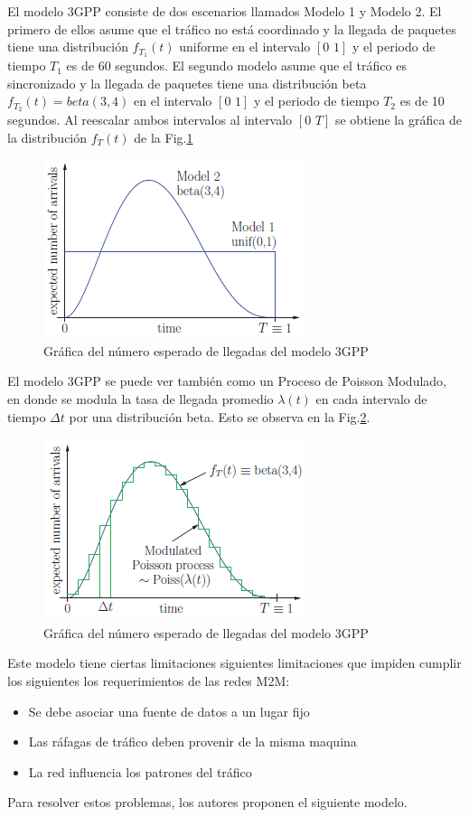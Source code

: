 \documentclass[journal]{IEEEtran}
\begin{document}
El modelo 3GPP consiste de dos escenarios llamados Modelo 1 y Modelo 2. El primero de ellos asume que el tr\'afico no est\'a coordinado y la llegada de paquetes tiene una distribuci\'on $f_{T_1}(t)$ uniforme en el intervalo $[0\hspace{4pt}1]$ y el periodo de tiempo $T_1$ es de 60 segundos. El segundo modelo asume que el tr\'afico es sincronizado y la llegada de paquetes tiene una distribuci\'on beta $f_{T_2}(t)=beta(3,4)$ en el intervalo $[0\hspace{4pt}1]$ y el periodo de tiempo $T_2$ es de 10 segundos. Al reescalar ambos intervalos al intervalo $[0\hspace{4pt}T]$ se obtiene la gr\'afica de la distribuci\'on $f_T(t)$ de la Fig.\ref{3GPP1}
\begin{figure}[H]
\centering
\includegraphics[scale=0.85]{graf1}
\caption{Gr\'afica del n\'umero esperado de llegadas del modelo 3GPP}
\label{3GPP1} 
\end{figure}
El modelo 3GPP se puede ver tambi\'en como un Proceso de Poisson Modulado, en donde se modula la tasa de llegada promedio $\lambda(t)$ en cada intervalo de tiempo $\Delta t$ por una distribuci\'on beta. Esto se observa en la Fig.\ref{3GPP2}.
\begin{figure}[H]
\centering
\includegraphics[scale=0.85]{graf2}
\caption{Gr\'afica del n\'umero esperado de llegadas del modelo 3GPP}
\label{3GPP2}
\end{figure} 
Este modelo tiene ciertas limitaciones siguientes limitaciones que impiden cumplir los siguientes los requerimientos de las redes M2M:
\begin{itemize}
\item Se debe asociar una fuente de datos a un lugar fijo 
\item Las r\'afagas de tr\'afico deben provenir de la misma maquina
\item La red influencia los patrones del tr\'afico
\end{itemize}
Para resolver estos problemas, los autores proponen el siguiente modelo.
\end{document}
